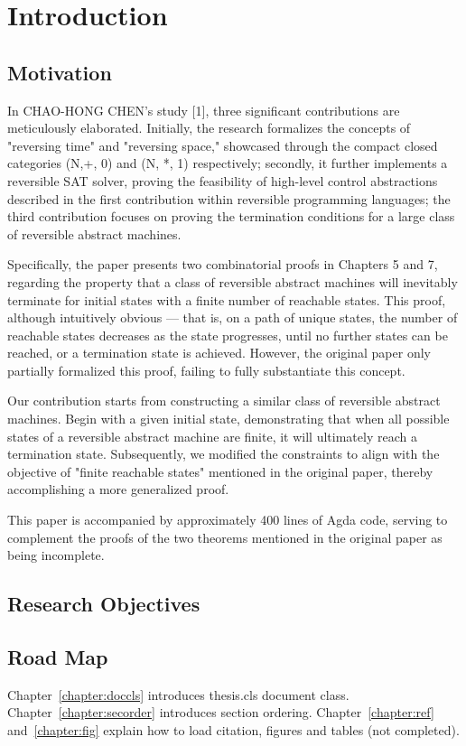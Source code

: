 \chapter{Introduction}
\label{chapter:intro}


\section{Motivation}

In CHAO-HONG CHEN's study [1], three significant contributions are meticulously elaborated. 
Initially, the research formalizes the concepts of "reversing time" and "reversing space," showcased through the compact closed categories (N,+, 0) and (N, *, 1) respectively; 
secondly, it further implements a reversible SAT solver, proving the feasibility of high-level control abstractions described in the first contribution within reversible programming languages; 
the third contribution focuses on proving the termination conditions for a large class of reversible abstract machines.

Specifically, the paper presents two combinatorial proofs in Chapters 5 and 7, regarding the property that a class of reversible abstract machines will inevitably terminate for initial states with a finite number of reachable states. 
This proof, although intuitively obvious — that is, on a path of unique states, the number of reachable states decreases as the state progresses, until no further states can be reached, or a termination state is achieved. 
However, the original paper only partially formalized this proof, failing to fully substantiate this concept.

Our contribution starts from constructing a similar class of reversible abstract machines. 
Begin with a given initial state, demonstrating that when all possible states of a reversible abstract machine are finite, it will ultimately reach a termination state.
Subsequently, we modified the constraints to align with the objective of "finite reachable states" mentioned in the original paper, thereby accomplishing a more generalized proof.

This paper is accompanied by approximately 400 lines of Agda code, serving to complement the proofs of the two theorems mentioned in the original paper as being incomplete.

\section{Research Objectives}


\section{Road Map}
Chapter~\ref{chapter:doccls} introduces thesis.cls document class.
Chapter~\ref{chapter:secorder} introduces section ordering.
Chapter~\ref{chapter:ref} and~\ref{chapter:fig} explain how to load citation, figures and tables (not completed).